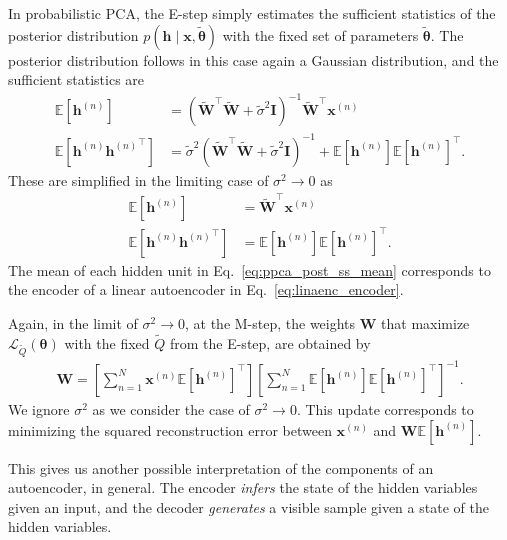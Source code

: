 \documentclass{now}
\newcommand{\vect}[1]{\mathbf{#1}}
\newcommand{\vects}[1]{\boldsymbol{#1}}
\newcommand{\matr}[1]{\mathbf{#1}}
\newcommand{\vh}[0]{\vect{h}}
\newcommand{\vx}[0]{\vect{x}}
\newcommand{\mW}[0]{\matr{W}}
\newcommand{\mI}{\matr{I}}
\newcommand{\TT}[0]{{\vects{\theta}}}
\newcommand{\LL}[0]{\mathcal{L}}
\newcommand{\E}[0]{\mathbb{E}}
\begin{document}
In probabilistic PCA, the E-step simply estimates the
sufficient statistics of the posterior distribution $p(\vh
\mid \vx, \tilde{\TT})$ with the fixed set of parameters
$\tilde{\TT}$.
The posterior distribution follows in this case again a
Gaussian distribution, and the sufficient statistics are
\begin{align*}
    \E \left[ \vh^{(n)} \right] &= (\tilde{\mW}^\top
    \tilde{\mW} + \tilde{\sigma}^2
    \mI)^{-1} \tilde{\mW}^\top \vx^{(n)} \\
    \E \left[ \vh^{(n)} {\vh^{(n)}}^\top \right] &=
    \tilde{\sigma}^2 (\tilde{\mW}^\top \tilde{\mW} +
    \tilde{\sigma}^2
    \mI)^{-1} + \E\left[\vh^{(n)}\right] \E\left[ \vh^{(n)}
    \right]^\top.
\end{align*}
These are simplified in the limiting case of $\sigma^2 \to
0$ as
\begin{align}
    \label{eq:ppca_post_ss_mean}
    \E \left[ \vh^{(n)} \right] &= \tilde{\mW}^\top \vx^{(n)} \\
    \label{eq:ppca_post_ss_cov}
    \E \left[ \vh^{(n)} {\vh^{(n)}}^\top \right] &=
    \E\left[\vh^{(n)}\right] \E\left[ \vh^{(n)}
    \right]^\top.
\end{align}
The mean of each hidden unit in
Eq.~\eqref{eq:ppca_post_ss_mean} 
corresponds to the
encoder of a linear autoencoder in
Eq.~\eqref{eq:linaenc_encoder}.

Again, in the limit of $\sigma^2 \to 0$, at the M-step, the
weights $\mW$ that maximize $\LL_{\tilde{Q}}(\TT)$ with the fixed
$\tilde{Q}$ from the E-step, are obtained by
\begin{align}
    \label{eq:ppca_m_weights}
    \mW = \left[ \sum_{n=1}^N \vx^{(n)} \E\left[ \vh^{(n)}
    \right]^\top \right]\left[ \sum_{n=1}^N \E\left[
    \vh^{(n)} \right] \E\left[ \vh^{(n)} \right]^\top
    \right]^{-1}.
\end{align}
We ignore $\sigma^2$ as we consider the case of $\sigma^2 \to
0$.  This update corresponds to minimizing the squared
reconstruction error between $\vx^{(n)}$ and $\mW
\E\left[\vh^{(n)}\right]$.


This gives us another possible interpretation of the
components of an autoencoder, in general. The encoder
\textit{infers} the state of the hidden variables given an
input, and the decoder \textit{generates} a visible sample
given a state of the hidden variables.
\end{document}
